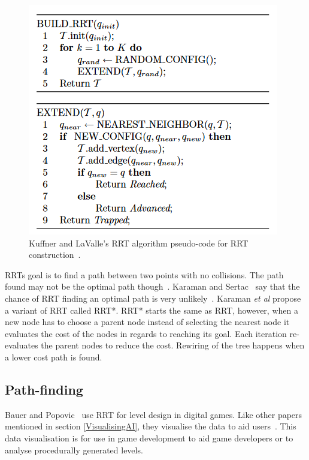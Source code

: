 \documentclass[journal]{IEEEtran}
\begin{document}
\begin{figure}[h]
	\includegraphics[width=1.0\linewidth]{RRTPseudocode.png}
	\caption{ Kuffner and LaValle's RRT algorithm pseudo-code for RRT construction~\cite{Kuffner2000}.}
	\label{RRTPseudocode}
\end{figure} 

RRTs goal is to find a path between two points with no collisions. The path found may not be the optimal path though~\cite{Kuffner2000, Karaman2011}. Karaman and Sertac~\cite{karaman2010} say that the chance of RRT finding an optimal path is very unlikely~\cite{karaman2010, Tremblay2014}.  Karaman \textit{et al} propose a variant of RRT called RRT*. RRT* starts the same as RRT, however, when a new node has to choose a parent node instead of selecting the nearest node it evaluates the cost of the nodes in regards to reaching its goal. Each iteration re-evaluates the parent nodes to reduce the cost. Rewiring of the tree happens when a lower cost path is found.


\subsection{Path-finding} \label{Pathfinding}
Bauer and Popovic~\cite{bauer2012} use RRT for level design in digital games. Like other papers mentioned in section \ref{VisualisingAI}, they visualise the data to aid users~\cite{bauer2012, Haworth2010}. This data visualisation is for use in game development to aid game developers or to analyse procedurally generated levels. 
\end{document}
